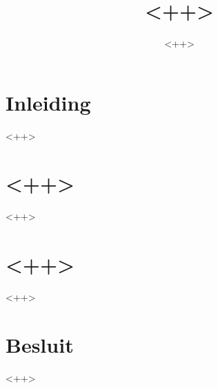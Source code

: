 \documentclass[kul]{kulakposter}
\title{<++>} %
\author{<++>} %
\institute{<++>} %
\begin{document}
\maketitle

\section*{Inleiding}
\begin{multicols}{2}\setlength{\columnseprule}{0pt}
    <++>
\end{multicols}

\begin{multicols}{2}
\section{<++>}
    <++>

\columnbreak
\section{<++>}
    <++>
\end{multicols}

\section*{Besluit}
\begin{multicols}{2}\setlength{\columnseprule}{0pt}
    <++>
\end{multicols}
\end{document}
